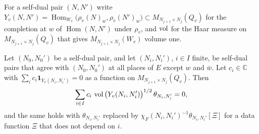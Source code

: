 For a self-dual pair $(N,N')$ write $Y_v(N,N')=\operatorname{Hom}_{W_v}\big(\rho_v(N)_w,\rho_v(N')_w\big)\subset M_{N_{j+1}\times N_j}(Q_v)$ for the completion at $w$ of $\operatorname{Hom}(N,N')$ under $\rho_v$, and $\operatorname{vol}$ for the Haar measure on $M_{N_{j+1}\times N_j}(Q_v)$ that gives $M_{N_{j+1}\times N_j}(W_v)$ volume one.

\begin{proposition}\label{r1:prop:schr}
Let $(N_0,N_0')$ be a self-dual pair, and let $(N_i,N_i')$, $i\in I$ finite, be self-dual pairs that agree with $(N_0,N_0')$ at all places of $E$ except $w$ and $\bar w$. Let $c_i\in\mathbb C$ with $\sum_ic_i\mathbf 1_{Y_v(N_i,N_i')}=0$ as a function on $M_{N_{j+1}\times N_j}(Q_v)$. Then
\[
\sum_{i\in I}c_i\,\operatorname{vol}\big(Y_v(N_i,N_i')\big)^{1/2}\,\theta_{N_i,N_i'}=0,
\]
and the same holds with $\theta_{N_i,N_i'}$ replaced by $\chi_F(N_i,N_i')^{-1}\theta_{N_i,N_i'}[\Xi]$ for a data function $\Xi$ that does not depend on $i$.
\end{proposition}

